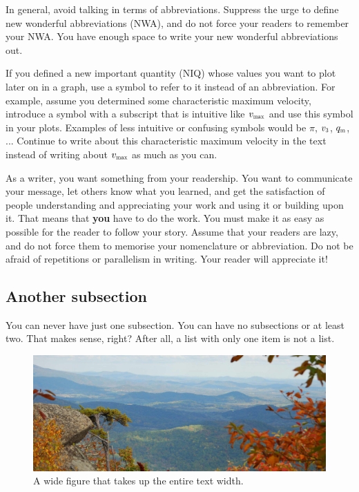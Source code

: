 \documentclass{AEM4602Wreport}
\newcommand{\kindex}[2]{\ensuremath{{#1}_{\scalebox{0.65}{#2}}}}
\begin{document}
In general, avoid talking in terms of abbreviations.
Suppress the urge to define new wonderful abbreviations (NWA), and do not force your readers to remember your NWA.
You have enough space to write your new wonderful abbreviations out.

If you defined a new important quantity (NIQ) whose values you want to plot later on in a graph, use a symbol to refer to it instead of an abbreviation.
For example, assume you determined some characteristic maximum velocity, introduce a symbol with a subscript that is intuitive like $\kindex{v}{max}$ and use this symbol in your plots.
Examples of less intuitive or confusing symbols would be $\pi$, $\kindex{v}{3}$, $\kindex{q}{m}$, ...
Continue to write about this characteristic maximum velocity in the text instead of writing about $\kindex{v}{max}$ as much as you can.

As a writer, you want something from your readership.
You want to communicate your message, let others know what you learned, and get the satisfaction of people understanding and appreciating your work and using it or building upon it.
That means that \textbf{you} have to do the work.
You must make it as easy as possible for the reader to follow your story.
Assume that your readers are lazy, and do not force them to memorise your nomenclature or abbreviation.
Do not be afraid of repetitions or parallelism in writing.
Your reader will appreciate it!

\subsection{Another subsection}
You can never have just one subsection.
You can have no subsections or at least two.
That makes sense, right?
After all, a list with only one item is not a list.

\begin{figure}[b!] %
\includegraphics[width=\textwidth]{view}
\caption{A wide figure that takes up the entire text width.}
\label{fig:view}
\end{figure}
\end{document}
